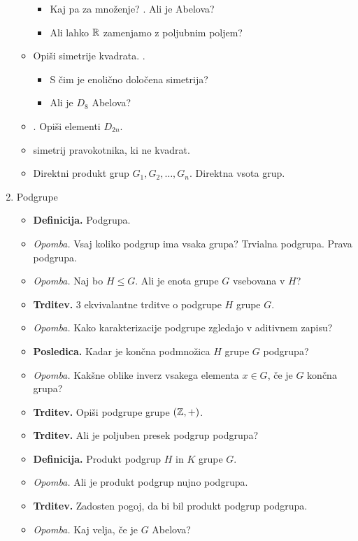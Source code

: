\begin{enumerate}
\begin{itemize}
\begin{itemize}
            \item Kaj pa za množenje? . Ali je Abelova?
            \item Ali lahko $\mathbb{R}$ zamenjamo z poljubnim poljem?
        \end{itemize}
        \item Opiši simetrije kvadrata. . 
        \begin{itemize}
            \item S čim je enolično določena simetrija?
            \item Ali je $D_8$ Abelova?
        \end{itemize}
        \item {}. Opiši elementi $D_{2n}$.
        \item {} simetrij pravokotnika, ki ne kvadrat.
        \item Direktni produkt grup $G_1, G_2, \ldots, G_n$. Direktna vsota grup.
    \end{itemize}

    \item Podgrupe
    \begin{itemize}
        \item \colorbox{purple!30}{\textbf{Definicija.}} Podgrupa.
        \item \colorbox{yellow!30}{\emph{Opomba.}} Vsaj koliko podgrup ima vsaka grupa? Trvialna podgrupa. Prava podgrupa.
        \item \colorbox{yellow!30}{\emph{Opomba.}} Naj bo $H \leq G$. Ali je enota grupe $G$ vsebovana v $H$?
        \item \colorbox{blue!30}{\textbf{Trditev.}} 3 ekvivalantne trditve o podgrupe $H$ grupe $G$.
        \item \colorbox{yellow!30}{\emph{Opomba.}} Kako karakterizacije podgrupe zgledajo v aditivnem zapisu?
        \item \colorbox{orange!30}{\textbf{Posledica.}} Kadar je končna podmnožica $H$ grupe $G$ podgrupa?
        \item \colorbox{yellow!30}{\emph{Opomba.}} Kakšne oblike inverz vsakega elementa $x \in G$, če je $G$ končna grupa?        
        \item \colorbox{blue!30}{\textbf{Trditev.}} Opiši podgrupe grupe $(\mathbb{Z}, +)$.
        \item \colorbox{blue!30}{\textbf{Trditev.}} Ali je poljuben presek podgrup podgrupa?
        \item \colorbox{purple!30}{\textbf{Definicija.}} Produkt podgrup $H$ in $K$ grupe $G$.
        \item \colorbox{yellow!30}{\emph{Opomba.}} Ali je produkt podgrup nujno podgrupa.
        \item \colorbox{blue!30}{\textbf{Trditev.}} Zadosten pogoj, da bi bil produkt podgrup podgrupa.
        \item \colorbox{yellow!30}{\emph{Opomba.}} Kaj velja, če je $G$ Abelova?
    \end{itemize}


\end{enumerate}

